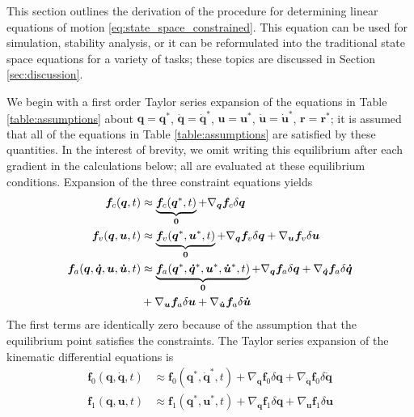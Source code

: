 \documentclass[smallcondensed]{svjour3}                     %
\begin{document}
This section outlines the derivation of the procedure for determining linear
equations of motion \ref{eq:state_space_constrained}. This equation can be used
for simulation, stability analysis, or it can be reformulated into the
traditional state space equations for a variety of tasks; these topics are
discussed in Section \ref{sec:discussion}.

We begin with a first order Taylor series expansion of the equations in Table
\ref{table:assumptions} about $\bm{q}=\bm{q}^*$, $\bm{\dot{q}}=\bm{\dot{q}}^*$,
$\bm{u}=\bm{u}^*$, $\bm{\dot{u}}=\bm{\dot{u}}^*$, $\bm{r}=\bm{r}^*$; it is
assumed that all of the equations in Table \ref{table:assumptions} are
satisfied by these quantities.  In the interest of brevity, we omit writing
this equilibrium after each gradient in the calculations below; all are
evaluated at these equilibrium conditions.  Expansion of the three constraint
equations yields
\begin{align}
  \label{eq:configuration_expansion}
  \bm{f}_{c}(\bm{q}, t) &\approx \underbrace{\bm{f}_{c}(\bm{q}^*, t)}_{\bm{0}} +
  \nabla_{\bm{q}}\bm{f}_{c} \delta \bm{q}\\
  \label{eq:velocity_expansion}
  \bm{f}_{v}(\bm{q}, \bm{u}, t) &\approx \underbrace{\bm{f}_{v}(\bm{q}^*,
  \bm{u}^*, t)}_{\bm{0}} +  \nabla_{\bm{q}}\bm{f}_{v} \delta \bm{q} +
  \nabla_{\bm{u}}\bm{f}_{v} \delta \bm{u} \\
  \label{eq:acceleration_expansion}
  \bm{f}_{a}(\bm{q}, \bm{\dot{q}}, \bm{u}, \bm{\dot{u}}, t) &\approx
  \underbrace{\bm{f}_{a}(\bm{q}^*, \bm{\dot{q}}^*, \bm{u}^*, \bm{\dot{u}}^*,
t)}_{\bm{0}} +  \nabla_{\bm{q}}\bm{f}_{a} \delta \bm{q} +
\nabla_{\bm{\dot{q}}}\bm{f}_{a}
 \delta \bm{\dot{q}} \notag\\
&+ \nabla_{\bm{u}}\bm{f}_{a} \delta \bm{u} + \nabla_{\bm{\dot{u}}}\bm{f}_{a}
\delta \bm{\dot{u}}
\end{align}
The first terms are identically zero because of the assumption that the
equilibrium point satisfies the constraints.  The Taylor series expansion of
the kinematic differential equations is
\begin{align}
  \label{eq:f0_expansion}
  \bm{f}_{0}(\bm{q}, \bm{\dot{q}}, t) &\approx \bm{f}_{0}(\bm{q}^*,
  \bm{\dot{q}}^*, t) + \nabla_{\bm{q}}\bm{f}_{0} \delta\bm{q} +
  \nabla_{\bm{\dot{q}}}\bm{f}_{0} \delta\bm{\dot{q}}\\
  \label{eq:f1_expansion}
  \bm{f}_{1}(\bm{q}, \bm{u}, t) &\approx \bm{f}_{1}(\bm{q}^*,
  \bm{u}^*, t) + \nabla_{\bm{q}}\bm{f}_{1} \delta\bm{q} +
  \nabla_{\bm{u}}\bm{f}_{1} \delta\bm{u}
\end{align}
\end{document}

